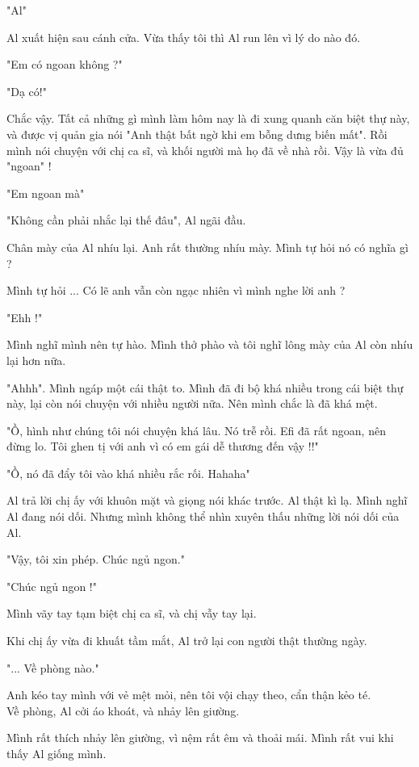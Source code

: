"Al"

Al xuất hiện sau cánh cửa. Vừa thấy tôi thì Al run lên vì lý do nào đó.

"Em có ngoan không ?"

"Dạ có!"

Chắc vậy. Tất cả những gì mình làm hôm nay là đi xung quanh căn biệt thự này, và được vị quản gia nói "Anh thật bất ngờ khi em bỗng dưng biến mất". Rồi mình nói chuyện với chị ca sĩ, và khối người mà họ đã về nhà rồi. Vậy là vừa đủ "ngoan" !

"Em ngoan mà"

"Không cần phải nhắc lại thế đâu", Al ngãi đầu.

Chân mày của Al nhíu lại. Anh rất thường nhíu mày. Mình tự hỏi nó có nghĩa gì ?

Mình tự hỏi ... Có lẽ anh vẫn còn ngạc nhiên vì mình nghe lời anh ?

"Ehh !"

Mình nghĩ mình nên tự hào. Mình thở phào và tôi nghĩ lông mày của Al còn nhíu lại hơn nữa.

"Ahhh". Mình ngáp một cái thật to. Mình đã đi bộ khá nhiều trong cái biệt thự này, lại còn nói chuyện với nhiều người nữa. Nên mình chắc là đã khá mệt.

"Ồ, hình như chúng tôi nói chuyện khá lâu. Nó trễ rồi. Efi đã rất ngoan, nên đừng lo. Tôi ghen tị với anh vì có em gái dễ thương đến vậy !!"

"Ồ, nó đã đẩy tôi vào khá nhiều rắc rối. Hahaha"

Al trả lời chị ấy với khuôn mặt và giọng nói khác trước. Al thật kì lạ. Mình nghĩ Al đang nói dối. Nhưng mình không thể nhìn xuyên thấu những lời nói dối của Al.

"Vậy, tôi xin phép. Chúc ngủ ngon."

"Chúc ngủ ngon !"

Mình vãy tay tạm biệt chị ca sĩ, và chị vẫy tay lại.

Khi chị ấy vừa đi khuất tầm mắt, Al trở lại con người thật thường ngày.

"... Về phòng nào."

Anh kéo tay mình với vẻ mệt mỏi, nên tôi vội chạy theo, cẩn thận kẻo té.\\


Về phòng, Al cởi áo khoát, và nhảy lên giường.

Mình rất thích nhảy lên giường, vì nệm rất êm và thoải mái. Mình rất vui khi thấy Al giống mình.

